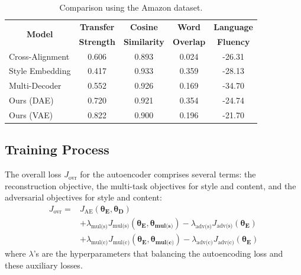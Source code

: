 \documentclass[letterpaper]{article} %
\newcommand{\tabh}[1]{\multicolumn{1}{c|}{\textbf{#1}}}
\newcommand{\tabc}[2]{\multicolumn{1}{|c||}{\multirow{#1}{*}{\textbf{#2}}}}
\newcommand{\loss}[1]{J_{\text{#1}}}
\newcommand{\hyp}[1]{\lambda_{\text{#1}}}
\newcommand{\nnweight}[1]{\bm{\theta_{\text{#1}}}}
\begin{document}
\begin{table}[ht]
	\centering
	\begin{tabular}{| l || c | c | c | c |}
		\hline
		\tabc{2}{Model}                            & \tabh{Transfer} & \tabh{Cosine}     & \tabh{Word}    & \tabh{Language} \\
		                                           & \tabh{Strength} & \tabh{Similarity} & \tabh{Overlap} & \tabh{Fluency}  \\
		\hline
		\hline
		Cross-Alignment \cite{shen2017style}       & 0.606           & 0.893             & 0.024          & -26.31          \\
		\hline
		Style Embedding \cite{fu2017style}         & 0.417           & 0.933             & 0.359          & -28.13          \\
		\hline
		Multi-Decoder \cite{zhao2018adversarially} & 0.552           & 0.926             & 0.169          & -34.70          \\
		\hline
		Ours (DAE)                                 & 0.720           & 0.921             & 0.354          & -24.74          \\
		\hline
		Ours (VAE)                                 & 0.822           & 0.900             & 0.196          & -21.70          \\
		\hline
	\end{tabular}
	\caption{Comparison using the Amazon dataset.}
	\label{tab:amazon-comparison-previous}
\end{table}

\subsection{Training Process}

The overall loss $\loss{ovr}$ for the autoencoder comprises several terms: the reconstruction objective, the multi-task objectives for style and content, and the adversarial objectives for style and content:
\begin{align}
	\loss{ovr} = & \loss{AE}(\nnweight{E}, \nnweight{D})  \nonumber                                                                   \\
	             & + \hyp{mul(s)} \loss{mul(s)} (\nnweight{E},\nnweight{mul(s)}) - \hyp{adv(s)} \loss{adv(s)}(\nnweight{E}) \nonumber \\
	             & + \hyp{mul(c)} \loss{mul(c)} (\nnweight{E},\nnweight{mul(c)}) - \hyp{adv(c)} \loss{adv(c)}(\nnweight{E})
\end{align}
where $\lambda$'s are the hyperparameters that balancing the autoencoding loss and these auxiliary losses.
\end{document}
